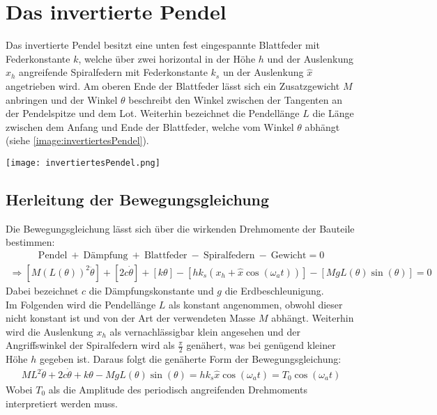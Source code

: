 

\section{Das invertierte Pendel}
\label{sec:invertPendel}
Das invertierte Pendel besitzt eine unten fest eingespannte Blattfeder mit Federkonstante $k$, welche über zwei horizontal in der Höhe $h$ und der Auslenkung $x_h$ angreifende Spiralfedern mit Federkonstante $k_s$ un der Auslenkung $\hat{x}$ angetrieben wird. Am oberen Ende der Blattfeder lässt sich ein Zusatzgewicht $M$ anbringen und der Winkel $\theta$ beschreibt den Winkel zwischen der Tangenten an der Pendelspitze und dem Lot. Weiterhin bezeichnet die Pendellänge $L$ die Länge zwischen dem Anfang und Ende der Blattfeder, welche vom Winkel $\theta$ abhängt (siehe \ref{image:invertiertesPendel}).
\begin{center}
    \texttt{[image: invertiertesPendel.png]}
    \label{image:invertiertesPendel}
\end{center}
\subsection{Herleitung der Bewegungsgleichung}
\label{sub:bewegungsgleichung}
Die Bewegungsgleichung lässt sich über die wirkenden Drehmomente der Bauteile bestimmen:
\begin{gather*}
        \text{Pendel}~+~\text{Dämpfung}~+~\text{Blattfeder}~-~\text{Spiralfedern}~-~\text{Gewicht} = 0
\end{gather*}
\begin{gather}
    \Rightarrow [M(L(\theta))^2\ddot{\theta}]+[2c\dot{\theta}]+[k\theta]-[hk_s(x_h+\hat{x}\cos(\omega_at))]-[MgL(\theta)\sin(\theta)]=0
\end{gather}
Dabei bezeichnet $c$ die Dämpfungskonstante und $g$ die Erdbeschleunigung.\\
Im Folgenden wird die Pendellänge $L$ als konstant angenommen, obwohl dieser nicht konstant ist und von der Art der verwendeten Masse $M$ abhängt. Weiterhin wird die Auslenkung $x_h$ als vernachlässigbar klein angesehen und der Angriffswinkel der Spiralfedern wird als $\frac{\pi}{2}$ genähert, was bei genügend kleiner Höhe $h$ gegeben ist.
Daraus folgt die genäherte Form der Bewegungsgleichung:
\begin{gather}
    ML^2\ddot{\theta}+2c\dot{\theta}+k\theta-MgL(\theta)\sin(\theta)=hk_s\hat{x}\cos(\omega_at)=T_0\cos(\omega_at)
\end{gather}
Wobei $T_0$ als die Amplitude des periodisch angreifenden Drehmoments interpretiert werden muss.

